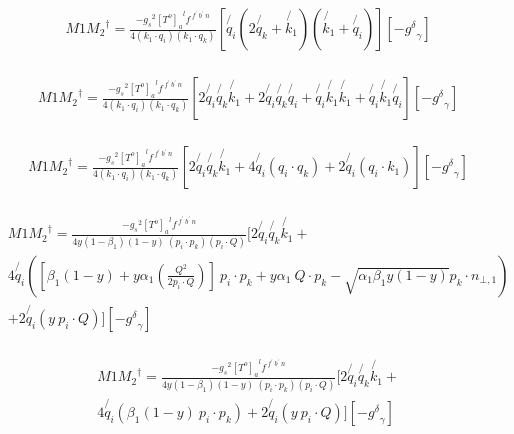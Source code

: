 \begin{equation}
\begin{split}
&M1{M_2}^{\dagger}=\frac{-{g_s}^2 {[T^{o}]_a}^{l} f^{\:f^{\prime}\: b^{\prime}\:n}}{4(k_1 \cdot q_i)(k_1 \cdot q_k)}[\not{q_i}(2\not{q_k}+\not{k_1})(\not{k_1}+\not{q_i})][-{g^{\delta}}_{\gamma}]\\
\end{split}
\end{equation}

\begin{equation}
\begin{split}
&M1{M_2}^{\dagger}=\frac{-{g_s}^2 {[T^{o}]_a}^{l} f^{\:f^{\prime}\: b^{\prime}\:n}}{4(k_1 \cdot q_i)(k_1 \cdot q_k)}
[2\not{q_i}\not{q_k}\not{k_1}+2\not{q_i}\not{q_k}\not{q_i}+\not{q_i}\not{k_1}\not{k_1}+\not{q_i}\not{k_1}\not{q_i}][-{g^{\delta}}_{\gamma}]\\
\end{split}
\end{equation}

\begin{equation}
\begin{split}
&M1{M_2}^{\dagger}=\frac{-{g_s}^2 {[T^{o}]_a}^{l} f^{\:f^{\prime}\: b^{\prime}\:n}}{4(k_1 \cdot q_i)(k_1 \cdot q_k)}
[2\not{q_i}\not{q_k}\not{k_1}+4\not{q_i}(q_i\cdot q_k)+2\not{q_i}(q_i\cdot k_1)][-{g^{\delta}}_{\gamma}]\\
\end{split}
\end{equation}

\begin{equation}
\begin{split}
&M1{M_2}^{\dagger}=\frac{-{g_s}^2 {[T^{o}]_a}^{l} f^{\:f^{\prime}\: b^{\prime}\:n}}{4y(1-\beta_1) (1-y)\:(p_i \cdot p_k)(p_i \cdot Q)}[2\not{q_i}\not{q_k}\not{k_1}+\\
&4\not{q_i}([\beta_1 (1-y)+y\alpha_1(\frac{Q^2}{2p_i \cdot Q})]\:p_i \cdot p_k+y\alpha_1\:Q\cdot p_k-\sqrt{\alpha_1\beta_1y(1-y)} p_k \cdot {n_{\bot,1}})\\
&+2\not{q_i}( y\:p_i\cdot Q)][-{g^{\delta}}_{\gamma}]\\
\end{split}
\end{equation}

\begin{equation}
\begin{split}
&M1{M_2}^{\dagger}=\frac{-{g_s}^2 {[T^{o}]_a}^{l} f^{\:f^{\prime}\: b^{\prime}\:n}}{4y(1-\beta_1) (1-y)\:(p_i \cdot p_k)(p_i \cdot Q)}
[2\not{q_i}\not{q_k}\not{k_1}+\\
&4\not{q_i}(\beta_1 (1-y)\:p_i \cdot p_k)+2\not{q_i}( y\:p_i\cdot Q)][-{g^{\delta}}_{\gamma}]\\
\end{split}
\end{equation}

